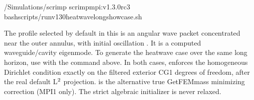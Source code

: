 \documentclass[letterpaper,10pt,english]{sphinxmanual}
\begin{document}
\begin{sphinxVerbatim}[commandchars=\\\{\}]
\PYGZti{}/Simulations/scrimp
scrimp\PYGZhy{}mpi:v1.3.0\PYGZhy{}rc3
bashscripts/run\PYGZhy{}v130\PYGZhy{}heat\PYGZhy{}wave\PYGZhy{}long\PYGZhy{}showcase.sh
\end{sphinxVerbatim}

\sphinxAtStartPar
The profile selected by default in this
 is an angular wave packet
 concentrated near the
outer annulus, with initial oscillation
. It is  a computed
waveguide/cavity eigenmode. To generate
the  heat\textendash{}wave case
over the same long horizon, use
with the command above.
In both cases, 
enforces the homogeneous Dirichlet
condition exactly on the filtered
exterior CG1 degrees of freedom, after
the real default L\(\sp{\text{2}}\) projection.
 is the alternative
true GetFEM\sphinxhyphen{}mass minimizing correction
(MPI1 only). The strict algebraic
initializer is never relaxed.
\end{document}
